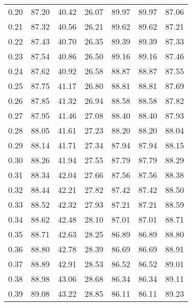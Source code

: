 \begin{tabular}{|c|c|c|c|c|c|c|}
      0.20 &     87.20 &     40.42 &      26.07 &   89.97 &      89.97 &         87.06 \\
      0.21 &     87.32 &     40.56 &      26.21 &   89.62 &      89.62 &         87.21 \\
      0.22 &     87.43 &     40.70 &      26.35 &   89.39 &      89.39 &         87.33 \\
      0.23 &     87.54 &     40.86 &      26.50 &   89.16 &      89.16 &         87.46 \\
      0.24 &     87.62 &     40.92 &      26.58 &   88.87 &      88.87 &         87.55 \\
      0.25 &     87.75 &     41.17 &      26.80 &   88.81 &      88.81 &         87.69 \\
      0.26 &     87.85 &     41.32 &      26.94 &   88.58 &      88.58 &         87.82 \\
      0.27 &     87.95 &     41.46 &      27.08 &   88.40 &      88.40 &         87.93 \\
      0.28 &     88.05 &     41.61 &      27.23 &   88.20 &      88.20 &         88.04 \\
      0.29 &     88.14 &     41.71 &      27.34 &   87.94 &      87.94 &         88.15 \\
      0.30 &     88.26 &     41.94 &      27.55 &   87.79 &      87.79 &         88.29 \\
      0.31 &     88.34 &     42.04 &      27.66 &   87.56 &      87.56 &         88.38 \\
      0.32 &     88.44 &     42.21 &      27.82 &   87.42 &      87.42 &         88.50 \\
      0.33 &     88.52 &     42.32 &      27.93 &   87.21 &      87.21 &         88.59 \\
      0.34 &     88.62 &     42.48 &      28.10 &   87.01 &      87.01 &         88.71 \\
      0.35 &     88.71 &     42.63 &      28.25 &   86.89 &      86.89 &         88.80 \\
      0.36 &     88.80 &     42.78 &      28.39 &   86.69 &      86.69 &         88.91 \\
      0.37 &     88.89 &     42.91 &      28.53 &   86.52 &      86.52 &         89.01 \\
      0.38 &     88.98 &     43.06 &      28.68 &   86.34 &      86.34 &         89.11 \\
      0.39 &     89.08 &     43.22 &      28.85 &   86.11 &      86.11 &         89.23 \\

\end{tabular}
